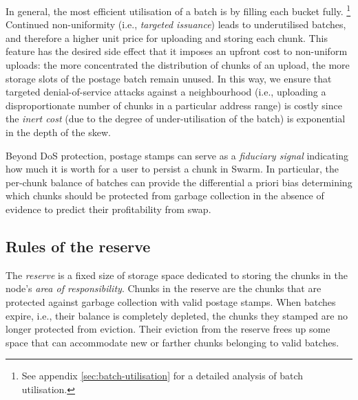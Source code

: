 In general, the most efficient utilisation of a batch is by filling each bucket fully.%
%
\footnote{See appendix \ref{sec:batch-utilisation} for a detailed analysis of batch utilisation.
}
%       
Continued non-uniformity (i.e., \emph{targeted issuance}) leads to underutilised batches, and therefore a higher unit price for uploading and storing each chunk. This feature has the desired side effect that it imposes an upfront cost to non-uniform uploads: the more concentrated the distribution of chunks of an upload, the more storage slots of the postage batch remain unused. In this way, we ensure that targeted denial-of-service attacks against a neighbourhood (i.e., uploading a disproportionate number of chunks in a particular address range) is costly since the \emph{inert cost} (due to the degree of under-utilisation of the batch) is exponential in the depth of the skew.

Beyond DoS protection, postage stamps can serve as a \emph{fiduciary signal} indicating how much it is worth for a user to persist a chunk in Swarm. In particular, the per-chunk balance of batches can provide the differential a priori bias determining which chunks should be protected from garbage collection in the absence of evidence to predict their profitability from swap. 



\subsection{Rules of the reserve}\label{sec:reserve}


The \emph{reserve} is a fixed size of storage space dedicated to storing the chunks in the node's \emph{area of responsibility}. Chunks in the reserve are the chunks that are protected against garbage collection with valid postage stamps. When batches expire, i.e., their balance is completely depleted, the chunks they stamped are no longer protected from eviction. Their eviction from the reserve frees up some space that can accommodate new or farther chunks belonging to valid batches.


